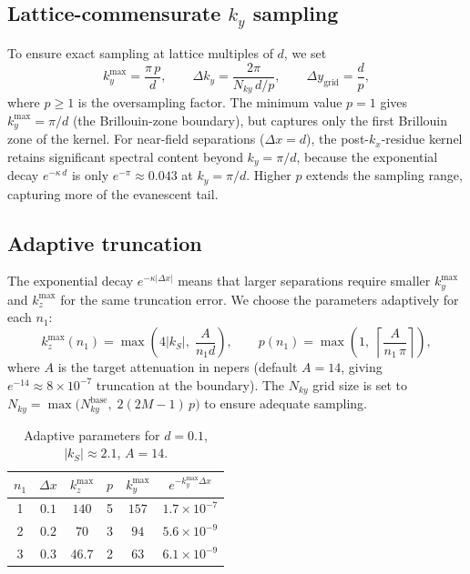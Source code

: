 \documentclass[11pt,a4paper]{article}
\begin{document}
\subsection{Lattice-commensurate \texorpdfstring{$k_y$}{ky} sampling}
\label{sec:commensurate}

To ensure exact sampling at lattice multiples of $d$, we set
\begin{equation}\label{eq:ky_grid}
  k_y^{\max} = \frac{\pi\,p}{d},
  \qquad
  \Delta k_y = \frac{2\pi}{N_{ky}\,d/p},
  \qquad
  \Delta y_{\text{grid}} = \frac{d}{p},
\end{equation}
where $p \ge 1$ is the oversampling factor.
The minimum value $p=1$ gives $k_y^{\max} = \pi/d$
(the Brillouin-zone boundary), but captures only the
first Brillouin zone of the kernel.
For near-field separations ($\Delta x = d$), the
post-$k_x$-residue kernel retains significant spectral
content beyond $k_y = \pi/d$, because the exponential
decay $e^{-\kappa\,d}$ is only $e^{-\pi}\approx 0.043$
at $k_y = \pi/d$.
Higher $p$ extends the sampling range, capturing more
of the evanescent tail.

\subsection{Adaptive truncation}\label{sec:adaptive}

The exponential decay $e^{-\kappa|\Delta x|}$ means that
larger separations require smaller $k_y^{\max}$ and
$k_z^{\max}$ for the same truncation error.
We choose the parameters adaptively for each $n_1$:
\begin{equation}\label{eq:adaptive}
  k_z^{\max}(n_1) = \max\!\left(4|k_S|,\;\frac{A}{n_1 d}\right),
  \qquad
  p(n_1) = \max\!\left(1,\;\left\lceil\frac{A}{n_1\,\pi}\right\rceil\right),
\end{equation}
where $A$ is the target attenuation in nepers (default $A=14$,
giving $e^{-14}\approx 8\times 10^{-7}$ truncation at the boundary).
The $N_{ky}$ grid size is set to
$N_{ky} = \max\bigl(N_{ky}^{\text{base}},\;2(2M-1)\,p\bigr)$
to ensure adequate sampling.

\begin{table}[ht]
\centering
\caption{Adaptive parameters for $d=0.1$, $|k_S|\approx 2.1$, $A=14$.}
\label{tab:adaptive}
\begin{tabular}{@{}cccccc@{}}
\toprule
$n_1$ & $\Delta x$ & $k_z^{\max}$ & $p$ & $k_y^{\max}$
      & $e^{-k_y^{\max}\Delta x}$ \\
\midrule
1 & $0.1$ & $140$  & 5 & $157$ & $1.7\times 10^{-7}$ \\
2 & $0.2$ & $70$   & 3 & $94$  & $5.6\times 10^{-9}$ \\
3 & $0.3$ & $46.7$ & 2 & $63$  & $6.1\times 10^{-9}$ \\
\bottomrule
\end{tabular}
\end{table}
\end{document}
